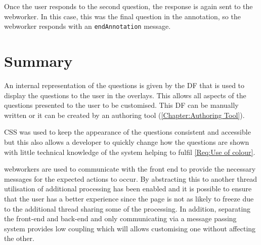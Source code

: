 Once the user responds to the second question, the response is again sent to the \gls{webworker}. In this case, this was the final question in the \gls{annotation}, so the \gls{webworker} responds with an \lstinline|endAnnotation| message.

\section{Summary}

An internal representation of the questions is given by the \gls{DF} that is used to display the questions to the user in the overlays. This allows all aspects of the questions presented to the user to be customised. This \gls{DF} can be manually written or it can be created by an authoring tool (\autoref{Chapter:Authoring Tool}).

\gls{CSS} was used to keep the appearance of the questions consistent and accessible but this also allows a developer to quickly change how the questions are shown with little technical knowledge of the system helping to fulfil \cref{Req:Use of colour}.

\Glspl{webworker} are used to communicate with the front end to provide the necessary messages for the expected actions to occur. By abstracting this to another thread utilisation of additional processing has been enabled and it is possible to ensure that the user has a better experience since the page is not as likely to freeze due to the additional thread sharing some of the processing. In addition, separating the front-end and back-end and only communicating via a message passing system provides low coupling which will allows customising one without affecting the other.
